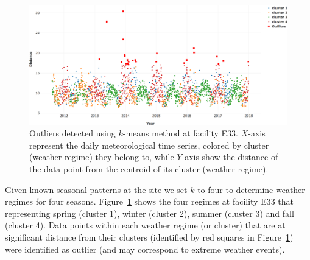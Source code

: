 \begin{figure}[ht]
    \centering
    \includegraphics[width=\textwidth]{figures/kmeans.png}
    \caption{Outliers detected using $k$-means method at facility E33.
		$X$-axis represent the daily meteorological time series, colored
		by cluster (weather regime) they belong to, while
		$Y$-axis show the distance of the data point from the centroid
		of its cluster (weather regime).}
    \label{fig:kmeans}
\end{figure}

Given known seasonal patterns at the site we set $k$ to four to
determine weather regimes for four seasons. Figure~\ref{fig:kmeans}
shows the four regimes at facility E33 that representing spring (cluster
1), winter (cluster 2), summer (cluster 3) and fall (cluster 4).
Data points within each weather regime (or cluster) that are at
significant distance from their clusters (identified by red squares in
Figure~\ref{fig:kmeans}) were identified as outlier (and may correspond
to extreme weather events).


